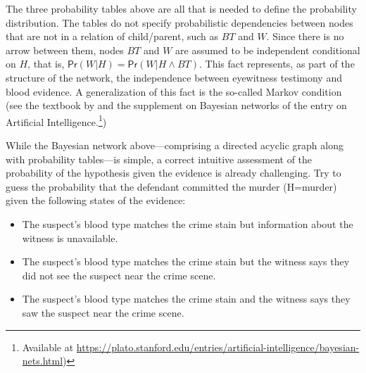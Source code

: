 \documentclass{article}
\newcommand{\pr}{\mathsf{Pr}}
\begin{document}
The three probability tables above are all that is needed to define the probability distribution. The tables do not specify probabilistic dependencies between nodes that are not in a relation of child/parent, such as $BT$ and $W$. Since there is no arrow between them, nodes $BT$ and $W$ are assumed to be independent conditional on $H$, that is, $\pr(W \vert H)=\pr(W \vert H \wedge BT)$. This fact represents, as part of the structure of the network, the independence between eyewitness testimony and  blood evidence. A generalization of this fact
is the so-called Markov condition (see the textbook by \cite{neapolitan2004learning} and the supplement on Bayesian networks of the entry on Artificial Intelligence.\footnote{Available at \url{https://plato.stanford.edu/entries/artificial-intelligence/bayesian-nets.html})})

While the Bayesian network above---comprising a directed acyclic graph along with probability tables---is simple, a correct intuitive assessment of
the probability of the hypothesis given the
evidence is already challenging. Try to guess the probability that the defendant committed the murder (H=murder) given 
the following states of the
evidence:

\begin{itemize} 
\item The suspect's blood type matches the crime stain but  information about the witness is unavailable.
\item The suspect's blood type matches the crime stain but the witness says they did not see the suspect near the crime scene.
\item The suspect's blood type matches the crime stain and the witness says they saw the suspect near the crime scene.
\end{itemize}

\end{document}
